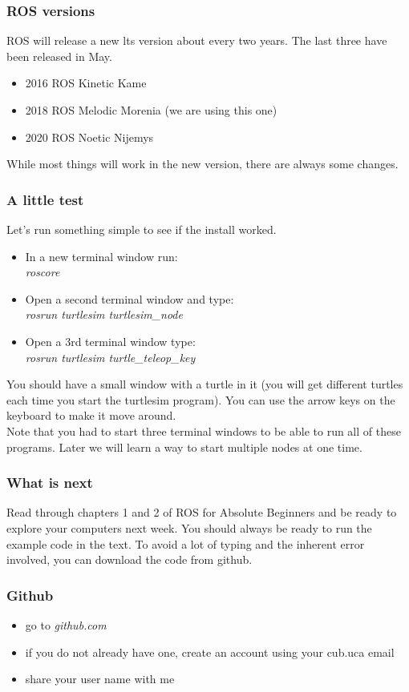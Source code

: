 \documentclass[12pt,letterpaper]{beamer}
\begin{document}
\begin{frame}
	\frametitle{ROS versions}
	ROS will release a new lts version about every two years. The last three have been released in May.
	\begin{itemize}
		\item 2016 ROS Kinetic Kame
		\item 2018 ROS Melodic Morenia (we are using this one)
		\item 2020 ROS Noetic Nijemys
	\end{itemize}
	While most things will work in the new version, there are always some changes.
\end{frame}

\begin{frame}
	\frametitle{A little test}
	Let's run something simple to see if the install worked. 
	\begin{itemize}
		\item In a new terminal window run:\\
			\emph{roscore}
		\item Open a second terminal window and type:\\
			\emph{rosrun turtlesim turtlesim\_node}
		\item Open a 3rd terminal window type:\\
			\emph{rosrun turtlesim turtle\_teleop\_key}
	\end{itemize}
	You should have a small window with a turtle in it (you will get different turtles each time you start the turtlesim program). You can use the arrow keys on the keyboard to make it move around.\\
	Note that you had to start three terminal windows to be able to run all of these programs. Later we will learn a way to start multiple nodes at one time.

\end{frame}

\begin{frame}
	\frametitle{What is next}
	Read through chapters 1 and 2 of ROS for Absolute Beginners and be ready to explore your computers next week. You should always be ready to run the example code in the text. To avoid a lot of typing and the inherent error involved, you can download the code from github.
\end{frame}

\begin{frame}
	\frametitle{Github}
	\begin{itemize}
		\item go to \emph{github.com}
		\item if you do not already have one, create an account using your cub.uca email
		\item share your user name with me
		
	\end{itemize}
\end{frame}
\end{document}
